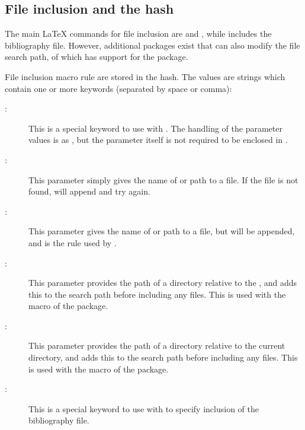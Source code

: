 \documentclass{article}
\begin{document}
\subsection{File inclusion and the  hash}

The main \LaTeX{} commands for file inclusion are  and , while  includes the  bibliography file. However, additional packages exist that can also modify the file search path, of which \TeXcount{} has support for the  package.

File inclusion macro rule are stored in the  hash. The values are strings which contain one or more keywords (separated by space or comma):
%
\begin{description}

\item[:] This is a special keyword to use with . The handling of the parameter values is as , but the parameter itself is not required to be enclosed in \code{\{\}}.

\item[:] This parameter simply gives the name of or path to a file. If the file is not found, \TeXcount{} will append  and try again.

\item[:] This parameter gives the name of or path to a file, but  will be appended, and is the rule used by .

\item[:] This parameter provides the path of a directory relative to the , and adds this to the search path before including any files. This is used with the  macro of the  package.

\item[:] This parameter provides the path of a directory relative to the current directory, and adds this to the search path before including any files. This is used with the  macro of the  package.

\item[:] This is a special keyword to use with  to specify inclusion of the bibliography file.

\end{description}
\end{document}
